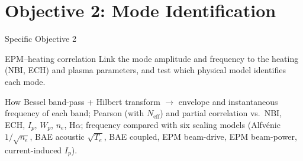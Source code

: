 \documentclass[aspectratio=169,xcolor=table]{beamer}
\begin{document}
\section{Objective 2: Mode Identification}

\begin{frame}{Specific Objective 2}
    \vfill
    \begin{block}{EPM--heating correlation}
        \large Link the mode amplitude and frequency to the heating (NBI, ECH) and
        plasma parameters, and test which physical model identifies each mode.
    \end{block}
    \vspace{0.5cm}
    \begin{exampleblock}{How}
        \small Bessel band-pass + Hilbert transform $\rightarrow$ envelope and instantaneous
        frequency of each band; Pearson (with $N_{\text{eff}}$) and partial correlation vs.\
        NBI, ECH, $I_p$, $W_p$, $n_e$, H$\alpha$; frequency compared with six scaling models
        (Alfvénic $1/\sqrt{n_e}$, BAE acoustic $\sqrt{T_e}$, BAE coupled, EPM beam-drive, EPM beam-power, current-induced $I_p$).
    \end{exampleblock}
    \vfill
\end{frame}
\end{document}
